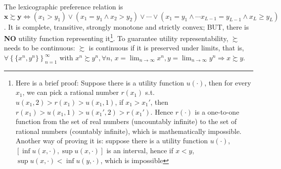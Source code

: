 The lexicographic preference relation is $\mathbf{x}\succsim \mathbf{y}\Leftrightarrow \left(x_1>y_1 \right) \lor \left( x_1=y_1 \land x_2> y_2\right) \lor \cdots \lor \left( x_1=y_1 \land \cdots x_{L-1}=y_{L-1} \land x_L\geq y_L \right)$. It is complete, transitive, strongly monotone and strictly convex; BUT, there is \textbf{NO} utility function
representing it\footnote{Here is a brief proof: Suppose there is a utility function $u(\cdot)$, then for every $x_1$, we can pick a rational number $r(x_1)$ s.t. $u(x_1,2)>r(x_1)>u(x_1,1)$, if $x_1 >x_1'$, then $r(x_1)>u(x_1,1)>u(x_1',2)>r(x_1')$. Hence $r(\cdot)$ is a one-to-one function from the set of real numbers (uncountably infinite) to the set of rational numbers (countably infinite), which is mathematically impossible. Another way of proving it is: suppose there is a utility function $u(\cdot)$, $[\inf u(x,\cdot),\sup u(x,\cdot)]$ is an interval, hence if $x<y$, $\sup u(x,\cdot)<\inf u(y,\cdot)$, which is impossible}.
To guarantee utility representability, $\succsim$ needs to be continuous: $\succsim$ is continuous if it is preserved under limits, that is, $\forall \left\{\{x^n,y^n\}\right\}^{\infty}_{n=1}$ with $x^n\succsim y^n, \forall n$, $x=\lim_{n\rightarrow\infty}x^n,y=\lim_{n\rightarrow\infty}y^n\Rightarrow x\succsim y$.

